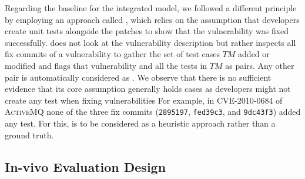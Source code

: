 Regarding the baseline for the integrated model, we followed a different principle by employing an approach called \fixCommits, which relies on the assumption that developers create unit tests alongside the patches to show that the vulnerability was fixed successfully.
\fixCommits does not look at the vulnerability description but rather inspects all fix commits of a vulnerability to gather the set of test cases $TM$ added or modified and flags that vulnerability and all the tests in $TM$ as \globalPosClass pairs.
Any other pair is automatically considered as \globalNegClass.
We observe that there is no sufficient evidence that its core assumption generally holds cases as developers might not create any test when fixing vulnerabilities
For example, in CVE-2010-0684 of \textsc{ActiveMQ} none of the three fix commits (\texttt{2895197}, \texttt{fed39c3}, and \texttt{9dc43f3}) added any test.
For this, \fixCommits is to be considered as a heuristic approach rather than a ground truth.


\subsection{In-vivo Evaluation Design}
\label{subsec:invivo}

